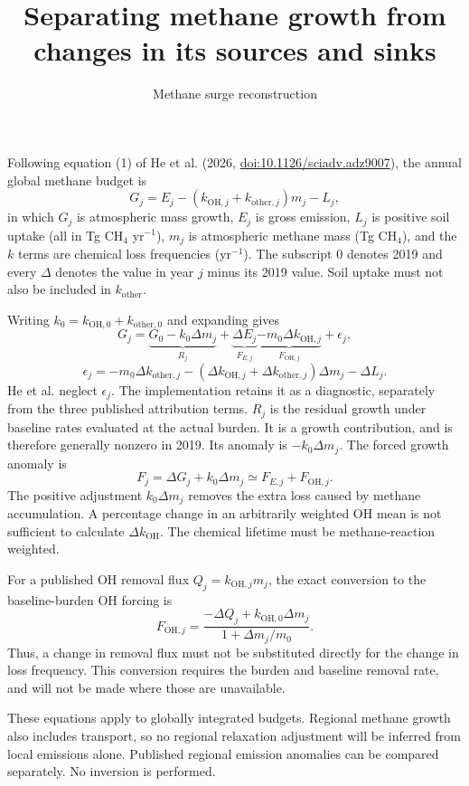 \documentclass[11pt]{article}
\title{Separating methane growth from changes in its sources and sinks}
\author{Methane surge reconstruction}
\date{}
\begin{document}
\maketitle
Following equation (1) of He et al. (2026,
\href{https://doi.org/10.1126/sciadv.adz9007}{doi:10.1126/sciadv.adz9007}),
the annual global methane budget is
\begin{equation}
 G_j=E_j-(k_{\mathrm{OH},j}+k_{\mathrm{other},j})m_j-L_j,
\end{equation}
in which $G_j$ is atmospheric mass growth, $E_j$ is gross emission,
$L_j$ is positive soil uptake (all in Tg CH$_4$ yr$^{-1}$), $m_j$ is
atmospheric methane mass (Tg CH$_4$), and the $k$ terms are chemical loss
frequencies (yr$^{-1}$). The subscript 0 denotes 2019 and every $\Delta$
denotes the value in year $j$ minus its 2019 value. Soil uptake must not
also be included in $k_{\mathrm{other}}$.

Writing $k_0=k_{\mathrm{OH},0}+k_{\mathrm{other},0}$ and expanding gives
\begin{equation}
 G_j=\underbrace{G_0-k_0\Delta m_j}_{R_j}
     +\underbrace{\Delta E_j}_{F_{E,j}}
     \underbrace{-m_0\Delta k_{\mathrm{OH},j}}_{F_{\mathrm{OH},j}}
     +\epsilon_j,
\end{equation}
\begin{equation}
 \epsilon_j=-m_0\Delta k_{\mathrm{other},j}
 -(\Delta k_{\mathrm{OH},j}+\Delta k_{\mathrm{other},j})\Delta m_j
 -\Delta L_j.
\end{equation}
He et al. neglect $\epsilon_j$. The implementation retains it as a
diagnostic, separately from the three published attribution terms.
$R_j$ is the residual growth under baseline rates evaluated at the
actual burden. It is a growth contribution, and is therefore generally
nonzero in 2019. Its anomaly is $-k_0\Delta m_j$. The forced growth
anomaly is
\begin{equation}
 F_j=\Delta G_j+k_0\Delta m_j
 \simeq F_{E,j}+F_{\mathrm{OH},j}.
\end{equation}
The positive adjustment $k_0\Delta m_j$ removes the extra loss caused
by methane accumulation. A percentage change in an arbitrarily weighted
OH mean is not sufficient to calculate $\Delta k_{\mathrm{OH}}$.
The chemical lifetime must be methane-reaction weighted.

For a published OH removal flux $Q_j=k_{\mathrm{OH},j}m_j$, the exact
conversion to the baseline-burden OH forcing is
\begin{equation}
 F_{\mathrm{OH},j}
 =\frac{-\Delta Q_j+k_{\mathrm{OH},0}\Delta m_j}
 {1+\Delta m_j/m_0}.
\end{equation}
Thus, a change in removal flux must not be substituted directly for
the change in loss frequency. This conversion requires the burden and
baseline removal rate, and will not be made where those are unavailable.

These equations apply to globally integrated budgets. Regional methane
growth also includes transport, so no regional relaxation adjustment
will be inferred from local emissions alone. Published regional emission
anomalies can be compared separately. No inversion is performed.
\end{document}

